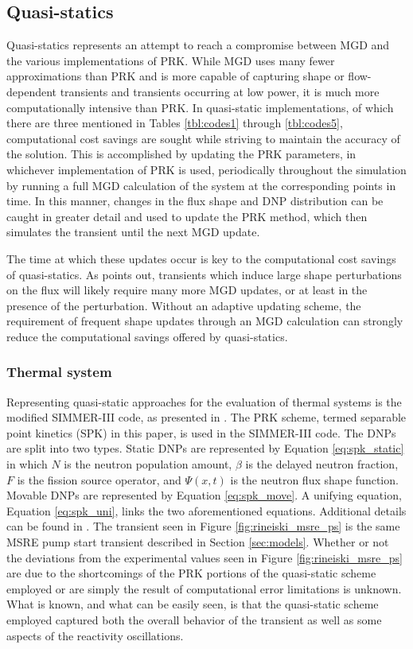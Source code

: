 \documentclass[review]{elsarticle}
\begin{document}
\subsection{Quasi-statics} \label{ssec:qs}
Quasi-statics represents an attempt to
reach a compromise between MGD and the various implementations of PRK. While
MGD uses many fewer approximations than PRK and is more capable of 
capturing shape or flow-dependent transients and transients occurring
at low power,
it is much more computationally intensive than PRK. In quasi-static
implementations, of which there are three mentioned in Tables \ref{tbl:codes1}
through \ref{tbl:codes5},
computational cost savings are sought while striving to maintain the accuracy
of the solution. This is accomplished by updating the PRK parameters, in
whichever implementation of PRK is used, periodically throughout the simulation
by running a full MGD calculation of the system at the corresponding points
in time. In this manner, changes in the flux shape and DNP distribution can
be caught in greater detail and used to update the PRK method, which then 
simulates the transient until the next MGD update.
\par The time at which these updates occur is key to the computational
 cost savings of
quasi-statics. As \cite{dulla_models_2005} points out, transients which induce
large shape perturbations on the flux will likely require many more MGD
updates, or at least in the presence of the perturbation. Without an adaptive
updating scheme, the requirement of frequent shape updates through an MGD
calculation can strongly reduce the computational savings offered by
quasi-statics.

\subsubsection{Thermal system} \label{sssec:qs_therm}
Representing quasi-static approaches for the evaluation of thermal systems
is the modified SIMMER-III code, as presented in \cite{rineiski_kinetics_2005}.
The PRK scheme, termed separable point kinetics (SPK) in this
paper, is used in the SIMMER-III code. The DNPs are split into two types.
Static DNPs are represented by Equation \ref{eq:spk_static} in which $N$ is the
neutron
population amount, $\beta$ is the delayed neutron fraction, $F$ is the fission
source operator, and $\Psi(x,t)$ is the neutron flux shape function.
Movable DNPs are represented by
Equation \ref{eq:spk_move}. A unifying equation, Equation \ref{eq:spk_uni},
links the two aforementioned equations.
Additional details can be found in \cite{rineiski_kinetics_2005}. The transient
seen in Figure \ref{fig:rineiski_msre_ps} is the same MSRE pump start transient
described in Section \ref{sec:models}. Whether or not the deviations from the
experimental values seen in Figure \ref{fig:rineiski_msre_ps} are due to the
shortcomings of the PRK portions of the quasi-static scheme employed or are
simply the result of computational error limitations is unknown. What is known,
and what can be easily seen, is that the quasi-static scheme employed captured
both the overall behavior of the transient as well as some aspects of the
reactivity oscillations.
\end{document}
